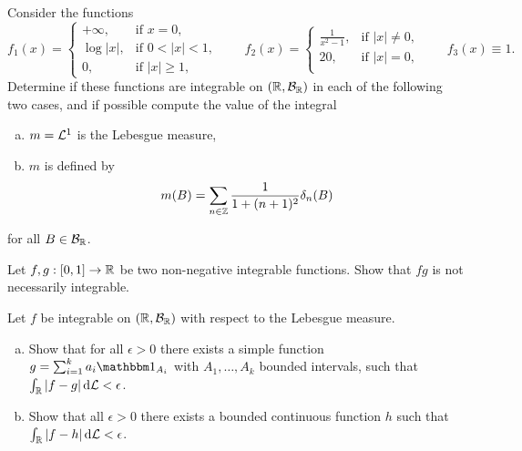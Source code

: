 \begin{problem}Consider the functions
    \begin{equation*}
        f_1(x) = \begin{cases}
            +\infty, & \text{if } x=0,\\
            \log|x|, & \text{if } 0<|x|<1,\\
            0, & \text{if }|x|\geq 1,
        \end{cases}
        \qquad 
        f_2(x) = \begin{cases}
            \frac{1}{x^2-1}, & \text{if } |x|\neq 0,\\
            20, & \text{if } |x| = 0,\\
        \end{cases}
        \qquad f_3(x)\equiv 1.
    \end{equation*}
    Determine if these functions are integrable on $(\mathbb R,\mathcal B_{\mathbb R})$ in each of the following two cases, and if possible compute the value of the integral
    \begin{enumerate}[a)]
        \item $m =\mathcal L^1$ is the Lebesgue measure,
        \item $m$ is defined by
        \begin{equation*}
            m(B) = \sum_{n\in \mathbb Z} \frac{1}{1+(n+1)^2} \delta_n(B)
        \end{equation*}
    \end{enumerate}
    for all $B\in \mathcal B_{\mathbb R}$.
\end{problem}

\begin{problem} Let $f,g: [0,1]\to\mathbb R$ be two non-negative integrable functions. Show that $fg$ is not necessarily integrable.
\end{problem}

\begin{problem} Let $f$ be integrable on $(\mathbb R,\mathcal B_{\mathbb R})$ with respect to the Lebesgue measure. 
    \begin{enumerate}[a)]
        \item Show that for all $\epsilon>0$ there exists a simple function $g = \sum_{i=1}^k a_i \indE{A_i}$ with $A_1,\ldots, A_k$ bounded intervals, such that $\int_{\mathbb R} |f-g|\,\mathrm{d} \mathcal L<\epsilon$.
        \item Show that all $\epsilon>0$ there exists a bounded continuous function $h$ such that $\int_{\mathbb R} |f-h|\,\mathrm{d} \mathcal L<\epsilon$.
    \end{enumerate}
\end{problem}

